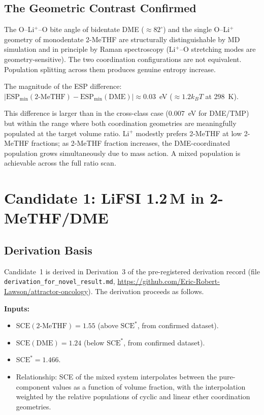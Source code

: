 \documentclass[11pt]{article}
\theoremstyle{plain}
\theoremstyle{definition}
\theoremstyle{remark}
\begin{document}
\subsection{The Geometric Contrast Confirmed}

The O--Li$^+$--O bite angle of bidentate DME ($\approx 82^\circ$)
and the single O--Li$^+$ geometry of monodentate 2-MeTHF are
structurally distinguishable by MD simulation and in principle by
Raman spectroscopy (Li$^+$--O stretching modes are geometry-sensitive).
The two coordination configurations are not equivalent.  Population
splitting across them produces genuine entropy increase.

The magnitude of the ESP difference:
$|\mathrm{ESP}_{\min}(\mathrm{2\text{-}MeTHF}) -
\mathrm{ESP}_{\min}(\mathrm{DME})| \approx 0.03$~eV
($\approx 1.2 k_BT$ at 298~K).

This difference is larger than in the cross-class case ($0.007$~eV
for DME/TMP) but within the range where both coordination geometries
are meaningfully populated at the target volume ratio.  Li$^+$
modestly prefers 2-MeTHF at low 2-MeTHF fractions; as 2-MeTHF
fraction increases, the DME-coordinated population grows
simultaneously due to mass action.  A mixed population is achievable
across the full ratio scan.

\section{Candidate 1: LiFSI 1.2\,M in 2-MeTHF/DME}
\label{sec:candidate1}

\subsection{Derivation Basis}

Candidate~1 is derived in Derivation~3 of the pre-registered derivation
record (file \texttt{derivation\_for\_novel\_result.md},
\url{https://github.com/Eric-Robert-Lawson/attractor-oncology}).
The derivation proceeds as follows.

\textbf{Inputs:}
\begin{itemize}[leftmargin=2em]
  \item $\mathrm{SCE}(\mathrm{2\text{-}MeTHF}) = 1.55$ (above
        $\mathrm{SCE}^{*}$, from confirmed dataset).
  \item $\mathrm{SCE}(\mathrm{DME}) = 1.24$ (below $\mathrm{SCE}^{*}$,
        from confirmed dataset).
  \item $\mathrm{SCE}^{*} = 1.466$.
  \item Relationship: SCE of the mixed system interpolates between the
        pure-component values as a function of volume fraction, with
        the interpolation weighted by the relative populations of
        cyclic and linear ether coordination geometries.
\end{itemize}
\end{document}
